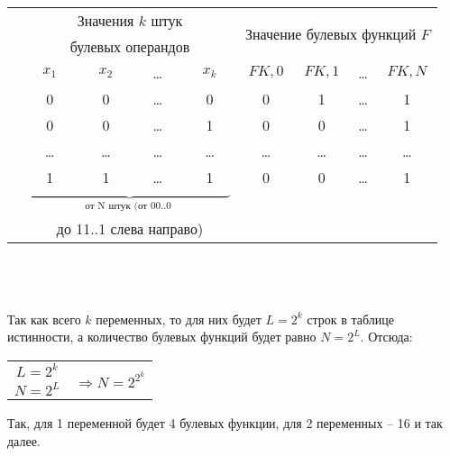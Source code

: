 \begin{minipage}[l]{9cm}

\begin{tabular}{c|c|c|c|c|c|c|c|c|}
\hhline{~--------}
& \multicolumn{4}{c|}{Значения $k$ штук} & \multicolumn{4}{c|}{\multirow{2}{*}{Значение булевых функций $F$}} \\
& \multicolumn{4}{c|}{булевых операндов} & \multicolumn{4}{c|}{}\\
\hhline{~--------}
& $x_1$ & $x_2$ & \dots & $x_k$ & $FK,0$ & $FK,1$ & \dots & $FK,N$ \\
\hhline{~--------}
 & 0 & 0 & \dots & 0 & 0 & 1 & \dots & 1\\
& 0 & 0 & \dots & 1 & 0 & 0 & \dots & 1\\
& \dots & \dots & \dots & \dots & \dots & \dots & \dots & \dots\\
\multirow{4}{*}{} & 1 & 1 & \dots & 1 & 0 & 0 & \dots & 1\\

\hhline{~--------}
\multicolumn{5}{c}{} & \multicolumn{4}{c}{$\underbrace{\qquad \qquad \qquad \qquad \qquad \qquad \qquad}_{\mbox{от N штук (от 00..0 }}$} \\
\multicolumn{5}{c}{} & \multicolumn{4}{c}{до 11..1 слева направо)}
\end{tabular}
\end{minipage}
\\
\\
\\
Так как всего $k$ переменных, то для них будет $L = 2^k$ строк в таблице истинности, а количество булевых функций будет равно $N = 2^L$. Отсюда:
\\
\begin{center}
\begin{tabular}{c c}
$L = 2^k$ & \multirow{2}{*}{$\Rightarrow N = 2^{2^{k}}$} \\
$N = 2^L$ & \\
\end{tabular}
\end{center}
Так, для 1 переменной будет 4 булевых функции, для 2 переменных -- 16 и так далее.
\newpage

